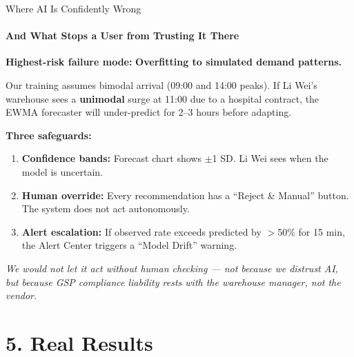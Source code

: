 \documentclass{beamer}
\begin{document}
\begin{frame}{Where AI Is Confidently Wrong}
  \framesubtitle{And What Stops a User from Trusting It There}
  \small

  \textbf{Highest-risk failure mode:} \textbf{Overfitting to simulated demand patterns.}

  \vspace{0.15cm}
  Our training assumes bimodal arrival (09:00 and 14:00 peaks). If Li Wei's warehouse sees a \textbf{unimodal} surge at 11:00 due to a hospital contract, the EWMA forecaster will under-predict for 2--3 hours before adapting.

  \vspace{0.2cm}
  \textbf{Three safeguards:}
  \begin{enumerate}
    \item \textbf{Confidence bands:} Forecast chart shows $\pm$1 SD. Li Wei sees when the model is uncertain.
    \item \textbf{Human override:} Every recommendation has a ``Reject \& Manual'' button. The system does not act autonomously.
    \item \textbf{Alert escalation:} If observed rate exceeds predicted by $>$50\% for 15 min, the Alert Center triggers a ``Model Drift'' warning.
  \end{enumerate}

  \vspace{0.15cm}
  \textit{We would not let it act without human checking --- not because we distrust AI, but because GSP compliance liability rests with the warehouse manager, not the vendor.}
\end{frame}

\section{5. Real Results}
\end{document}
